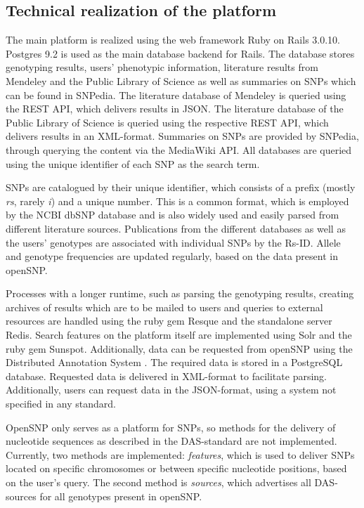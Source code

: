 \documentclass[10pt]{article}
\begin{document}
\subsection*{Technical realization of the platform}
The main platform is realized using the web framework Ruby on Rails 3.0.10. Postgres 9.2 is used as the main database backend for Rails. 
The database stores genotyping results, users' phenotypic information, literature results from Mendeley and the Public Library of Science as well as summaries on SNPs 
which can be found in SNPedia. The literature database of Mendeley is queried using the REST API, which delivers results in JSON. The literature database of 
the Public Library of Science is queried using the respective REST API, which delivers results in an XML-format. Summaries on SNPs are provided by SNPedia, 
through querying the content via the MediaWiki API. All databases are queried using the unique identifier of each SNP as the search term. 

SNPs are catalogued by their unique identifier, which consists of a prefix (mostly \textit{rs}, rarely \textit{i}) and a unique number. This is a common format, 
which is employed by the NCBI dbSNP database and is also widely used and easily parsed from different literature sources. Publications from the different databases as 
well as the users' genotypes are associated with individual SNPs by the Rs-ID. Allele and genotype frequencies are updated regularly, based on the data present in openSNP. 

Processes with a longer runtime, such as parsing the genotyping results, creating archives of results which are to be mailed to users and queries to external resources 
are handled using the ruby gem Resque and the standalone server Redis. Search features on the platform itself are implemented using Solr and the ruby gem Sunspot. 
Additionally, data can be requested from openSNP using the Distributed Annotation System \cite{Dowell2001,Jenkinson2008}. The required data is stored in a PostgreSQL database.  
Requested data is delivered in XML-format to facilitate parsing. Additionally, users can request data in the JSON-format, using a system not specified in any standard.

OpenSNP only serves as a platform for SNPs, so methods for the delivery of nucleotide sequences as described in the DAS-standard are not implemented. Currently, 
two methods are implemented: \textit{features}, which is used to deliver SNPs located on specific chromosomes or between specific nucleotide positions, 
based on the user's query. The second method is \textit{sources}, which advertises all DAS-sources for all genotypes present in openSNP.
\end{document}
